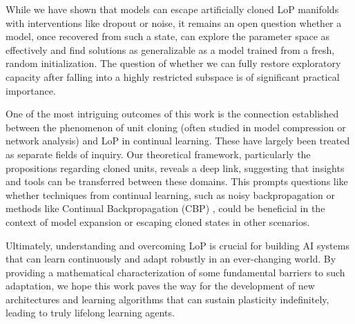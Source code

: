 \documentclass{article}
\numberwithin{figure}{section}
\begin{document}
While we have shown that models can escape artificially cloned LoP manifolds with interventions like dropout or noise, it remains an open question whether a model, once recovered from such a state, can explore the parameter space as effectively and find solutions as generalizable as a model trained from a fresh, random initialization. The question of whether we can fully restore exploratory capacity after falling into a highly restricted subspace is of significant practical importance.

One of the most intriguing outcomes of this work is the connection established between the phenomenon of unit cloning (often studied in model compression or network analysis) and LoP in continual learning. These have largely been treated as separate fields of inquiry. Our theoretical framework, particularly the propositions regarding cloned units, reveals a deep link, suggesting that insights and tools can be transferred between these domains.  This prompts questions like whether techniques from continual learning, such as noisy backpropagation or methods like Continual Backpropagation (CBP) \citep{dohare2024loss}, could be beneficial in the context of model expansion or escaping cloned states in other scenarios.

Ultimately, understanding and overcoming LoP is crucial for building AI systems that can learn continuously and adapt robustly in an ever-changing world. By providing a mathematical characterization of some fundamental barriers to such adaptation, we hope this work paves the way for the development of new architectures and learning algorithms that can sustain plasticity indefinitely, leading to truly lifelong learning agents.


\end{document}
